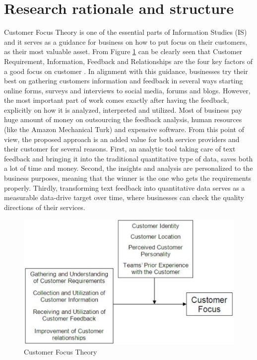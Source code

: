 {{\section{Research rationale and structure}
Customer Focus Theory is one of the essential parts of Information Studies (IS) and it serves as a guidance for business on how to put focus on their customers, as their most valuable asset. From Figure \ref{fig:cusfoc} can be clearly seen that Customer Requirement, Information, Feedback and Relationships are the four key factors of a good focus on customer \cite{lohan2011examining}. In alignment with this guidance, businesses try their best on gathering customers information and feedback in several ways starting online forms, surveys and interviews to social media, forums and blogs. However, the most important part of work comes exactly after having the feedback, explicitly on how it is analyzed, interpreted and utilized. Most of business pay huge amount of money on outsourcing the feedback analysis, human resources (like the Amazon Mechanical Turk) and expensive software. From this point of view, the proposed approach is an added value for both service providers and their customer for several reasons. First, an analytic tool taking care of text feedback and bringing it into the traditional quantitative type of data, saves both a lot of time and money. Second, the insights and analysis are personalized to the business purposes, meaning that the winner is the one who gets the requirements properly. Thirdly, transforming text feedback into quantitative data serves as a measurable data-drive target over time, where businesses can check the quality directions of their services.
\begin{figure}[h!]
	\centering
	\includegraphics[height=0.25\textheight]{fig01/CustomerFocus}
	\caption{Customer Focus Theory}
	\label{fig:cusfoc}
\end{figure}

}}
